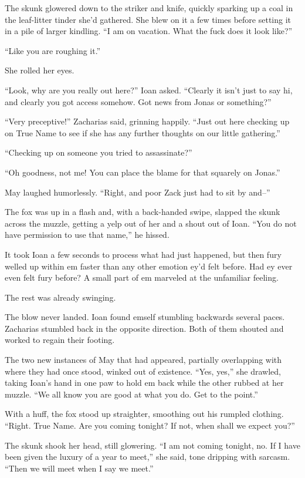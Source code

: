 The skunk glowered down to the striker and knife, quickly sparking up a coal in the leaf-litter tinder she'd gathered. She blew on it a few times before setting it in a pile of larger kindling. ``I am on vacation. What the fuck does it look like?''

``Like you are roughing it.''

She rolled her eyes.

``Look, why are you really out here?'' Ioan asked. ``Clearly it isn't just to say hi, and clearly you got access somehow. Got news from Jonas or something?''

``Very preceptive!'' Zacharias said, grinning happily. ``Just out here checking up on True Name to see if she has any further thoughts on our little gathering.''

``Checking up on someone you tried to assassinate?''

``Oh goodness, not me! You can place the blame for that squarely on Jonas.''

May laughed humorlessly. ``Right, and poor Zack just had to sit by and--''

The fox was up in a flash and, with a back-handed swipe, slapped the skunk across the muzzle, getting a yelp out of her and a shout out of Ioan. ``You do not have permission to use that name,'' he hissed.

It took Ioan a few seconds to process what had just happened, but then fury welled up within em faster than any other emotion ey'd felt before. Had ey ever even felt fury before? A small part of em marveled at the unfamiliar feeling.

The rest was already swinging.

The blow never landed. Ioan found emself stumbling backwards several paces. Zacharias stumbled back in the opposite direction. Both of them shouted and worked to regain their footing.

The two new instances of May that had appeared, partially overlapping with where they had once stood, winked out of existence. ``Yes, yes,'' she drawled, taking Ioan's hand in one paw to hold em back while the other rubbed at her muzzle. ``We all know you are good at what you do. Get to the point.''

With a huff, the fox stood up straighter, smoothing out his rumpled clothing. ``Right. True Name. Are you coming tonight? If not, when shall we expect you?''

The skunk shook her head, still glowering. ``I am not coming tonight, no. If I have been given the luxury of a year to meet,'' she said, tone dripping with sarcasm. ``Then we will meet when I say we meet.''

